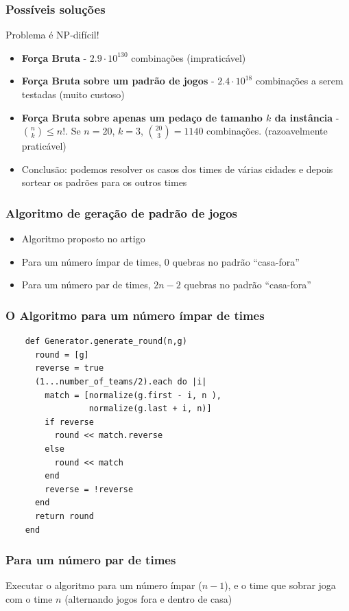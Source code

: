 \documentclass{beamer}
\begin{document}
\begin{frame}
  \frametitle{Possíveis soluções}
  Problema é NP-difícil!
  \begin{itemize}
    \item \textbf{Força Bruta} - $2.9 \cdot 10^{130}$ combinações (impraticável)
    \item \textbf{Força Bruta sobre um padrão de jogos} - $2.4 \cdot 10^{18}$ combinações a serem testadas (muito custoso)
    \item \textbf{Força Bruta sobre apenas um pedaço de tamanho $k$ da instância} - $\binom{n}{k} \le n!$. Se $n = 20$, $k = 3$, 
    $\binom{20}{3} = 1140$ combinações. (razoavelmente praticável)
    \item Conclusão: podemos resolver os casos dos times de várias cidades e depois sortear os padrões para os outros times
  \end{itemize}
\end{frame}

\begin{frame}
  \frametitle{Algoritmo de geração de padrão de jogos}
  \begin{itemize}
    \item Algoritmo proposto no artigo \cite{holandes}
    \item Para um número ímpar de times, $0$ quebras no padrão ``casa-fora''
    \item Para um número par de times, $2n-2$ quebras no padrão ``casa-fora''
  \end{itemize}
\end{frame}

\begin{frame}[fragile]
  \frametitle{O Algoritmo para um número ímpar de times}
\begin{verbatim}
    def Generator.generate_round(n,g)
      round = [g]
      reverse = true
      (1...number_of_teams/2).each do |i|
        match = [normalize(g.first - i, n ),
                 normalize(g.last + i, n)]
        if reverse
          round << match.reverse
        else
          round << match
        end
        reverse = !reverse
      end
      return round
    end
\end{verbatim}
\end{frame}

\begin{frame}
  \frametitle{Para um número par de times}
    Executar o algoritmo para um número ímpar ($n-1$), e o time que sobrar joga com o time $n$ (alternando jogos fora e dentro de casa)
\end{frame}
\end{document}
